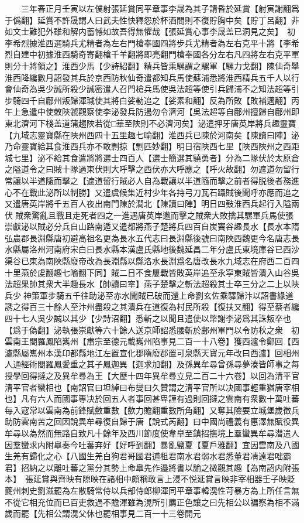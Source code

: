 　　三年春正月壬寅以左僕射張延賞同平章事李晟為其子請昏於延賞【射寅謝翻爲于僞翻】延賞不許晟謂人曰武夫性快釋怨於杯酒間則不復貯胸中矣【貯丁呂翻】非如文士難犯外雖和解内蓄憾如故吾得無懼哉【張延賞心事李晟盖已洞見之矣】　初李希烈據淮西選騎兵尤精者為左右門槍奉國四將步兵尤精者為左右克平十將【李希烈自建中初據淮西騎奇寄翻槍千羊翻將即亮翻門槍奉國各分左右凡四將左右克平軍則分十將領之】淮西少馬【少詩紹翻】精兵皆乘騾謂之騾軍【騾力戈翻】陳仙奇舉淮西降纔數月詔發其兵於京西防秋仙奇遣都知兵馬使蘇浦悉將淮西精兵五千人以行會仙奇為吳少誠所殺少誠密遣人召門槍兵馬使吳法超等使引兵歸浦不之知法超等引步騎四千自鄜州叛歸渾瑊使其將白娑勒追之【娑素和翻】反為所敗【敗補邁翻】丙午上急遣中使敇陜虢觀察使李泌發兵防遏勿令濟河【吳法超等自鄜州擅歸自鄜州即東北濟河下棧盖道蒲趨陜若從□華至陜則不必濟河矣】泌遣押牙唐英岸將兵趣靈寶【九域志靈寶縣在陜州西四十五里趣七喻翻】淮西兵已陳於河南矣【陳讀曰陣】泌乃命靈寶給其食淮西兵亦不敢剽掠【剽匹妙翻】明日宿陜西七里【陜西陜州之西距城七里】泌不給其食遣將將選士四百人【選士簡選其驍勇者】分為二隊伏於太原倉之隘道令之曰賊十隊過東伏則大呼擊之西伏亦大呼應之【呼火故翻】勿遮道勿留行常讓以半道隨而擊之【遮道留行賊必人自為戰讓以半道隨而擊之前者得脱後者務進心不在戰此泌所以制勝】又遣虞候集近村少年各持弓刀瓦石躡賊後聞呼亦應而追之又遣唐英岸將千五百人夜出南門陳於澗北【陳讀曰陣】明日四鼓淮西兵起行入隘兩伏賊衆驚亂且戰且走死者四之一進遇唐英岸邀而擊之賊衆大敗擒其騾軍兵馬使張崇獻泌以賊必分兵自山路南遁又遣都將燕子楚將兵四百自炭竇谷趣長水【長水本隋弘農郡長淵縣唐初避高祖名更為長水五代志曰長淵縣後號曰南陜西魏更今名唐志長水縣屬洛州河南府宋白曰長水縣本漢盧氏縣地後魏延昌二年分盧氏東境庫谷已西沙渠谷已東為南陜縣廢帝改為長淵縣以縣洛水長淵爲名唐改長水九域志在府西二百四十里燕於䖍翻趣七喻翻下同】賊二日不食屢戰皆敗英岸追至永寜東賊皆潰入山谷吳法超果帥其衆大半趣長水【帥讀曰率】燕子楚擊之斬法超殺其士卒三分之二上以陜兵少神策軍步騎五千往助泌至赤水聞賊已破而還上命劉玄佐乘驛歸汴以詔書緣道誘之得百三十餘人至汴州盡殺之其潰兵在道復為村民所殺【復扶又翻】得至蔡者纔四十七人吳少誠以其少【少詩沼翻】悉斬之以聞且遣使以幣謝李泌爲其誅叛卒也【爲于偽翻】泌執張崇獻等六十餘人送京師詔悉腰斬於鄜州軍門以令防秋之衆　初雲南王閤羅鳳陷嶲州【肅宗至德元載嶲州陷事見二百一十八卷】獲西瀘令鄭回【西瀘縣屬嶲州本漢卬都縣地江左置宣化郡隋廢郡置可泉縣天寶元年改曰西瀘】回相州人通經術閤羅鳳愛重之其子鳳迦異【迦求加翻】及孫異牟尋曾孫尋夢湊皆師事之每授學回得撻之及異牟尋為王【大歷十四年異牟尋立見二百二十六卷】以回為清平官清平官者蠻相也【南詔官曰坦綽曰布燮曰久贊謂之清平官所以决國事輕重猶唐宰相也】凡有六人而國事專决於回五人者事回甚卑謹有過則回撻之雲南有衆數十萬吐蕃每入寇常以雲南為前鋒賦斂重數【歛力贍翻重數所角翻】又奪其險要立城堡歲徵兵助防雲南苦之回因說異牟尋復自歸于唐【說式芮翻】曰中國尚禮義有惠澤無賦役異牟尋以為然而無路自致凡十餘年及西川節度使韋臯至鎮招撫境上羣蠻異牟尋潜遣人因羣蠻求内附臯奏今吐蕃弃好【好呼到翻】暴亂鹽夏【夏戶雅翻】宜因雲南及八國生羌有歸化之心【八國生羌白狗君哥國君逋租君南水君弱水君悉董君凊遠君咄霸君】招納之以離吐蕃之黨分其勢上命臯先作邉將書以諭之微觀其趣【為南詔内附張本】　張延賞與齊映有隙映在諸相中頗稱敢言上浸不悦延賞言映非宰相器壬子映貶夔州刺史劉滋罷為左散騎常侍以兵部侍郎柳渾同平章事韓滉性苛暴方為上所任言無不從它相充位而已百吏救過不贍渾雖為滉所引薦正色讓之曰先相公以褊察為相不滿歲而罷【先相公謂滉父休也罷相事見二百一十三卷開元